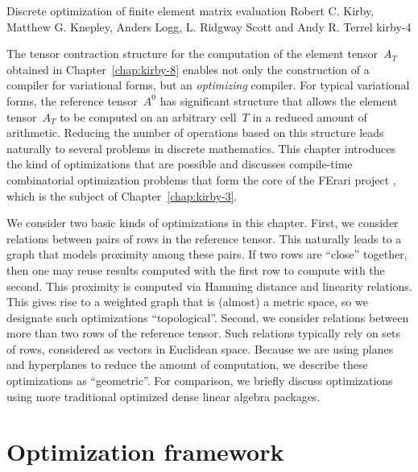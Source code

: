               {Discrete optimization of finite element matrix evaluation}
              {Robert C. Kirby, Matthew G. Knepley, Anders Logg, L. Ridgway Scott and Andy R. Terrel}
              {kirby-4}

\vspace{-0.5cm}

The tensor contraction structure for the computation of the element
tensor~$A_T$ obtained in Chapter~\ref{chap:kirby-8} enables not only
the construction of a compiler for variational forms, but an
\emph{optimizing} compiler. For typical variational forms, the
reference tensor~$A^0$ has significant structure that allows the
element tensor~$A_T$ to be computed on an arbitrary cell~$T$ in a
reduced amount of arithmetic. Reducing the number of operations based
on this structure leads naturally to several problems in discrete
mathematics.  This chapter introduces the kind of optimizations that
are possible and discusses compile-time combinatorial optimization
problems that form the core of the FErari
project \citep{KirbyLoggScottEtAl2006,KirbyScott2007,KirbyLogg2008},
which is the subject of Chapter~\ref{chap:kirby-3}.

We consider two basic kinds of optimizations in this chapter. First,
we consider relations between pairs of rows in the reference tensor.
This naturally leads to a graph that models proximity among these
pairs.  If two rows are ``close'' together, then one may reuse results
computed with the first row to compute with the second. This proximity
is computed via Hamming distance and linearity relations.  This gives
rise to a weighted graph that is (almost) a metric space, so we
designate such optimizations ``topological''. Second, we consider
relations between more than two rows of the reference tensor. Such
relations typically rely on sets of rows, considered as vectors in
Euclidean space. Because we are using planes and hyperplanes to reduce
the amount of computation, we describe these optimizations as
``geometric''.  For comparison, we briefly discuss optimizations using
more traditional optimized dense linear algebra packages.

\section{Optimization framework}


